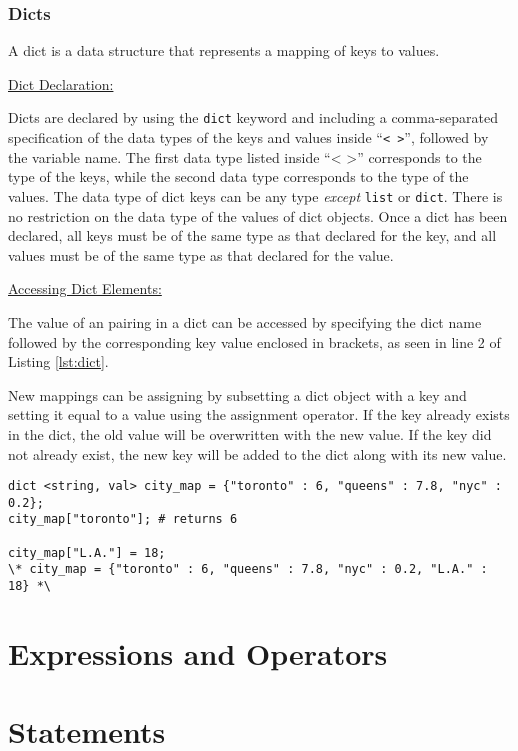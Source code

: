 \documentclass{article}
\newcommand{\code}[1]{\texttt{#1}} %
\begin{document}
\subsubsection{Dicts}

A dict is a data structure that represents a mapping of keys to values. 

\underline{Dict Declaration:}

Dicts are declared by using the \code{dict} keyword and including a comma-separated specification of the data types of the keys and values inside ``\code{< >}'', followed by the variable name. The first data type listed inside ``< >'' corresponds to the type of the keys, while the second data type corresponds to the type of the values. The data type of dict keys can be any type \emph{except} \code{list} or \code{dict}. There is no restriction on the data type of the values of dict objects. Once a dict has been declared, all keys must be of the same type as that declared for the key, and all values must be of the same type as that declared for the value. 

\underline{Accessing Dict Elements:}

The value of an pairing in a dict can be accessed by specifying the dict name followed by the corresponding key value enclosed in brackets, as seen in line 2 of Listing \ref{lst:dict}.

New mappings can be assigning by subsetting a dict object with a key and setting it equal to a value using the assignment operator. If the key already exists in the dict, the old value will be overwritten with the new value. If the key did not already exist, the new key will be added to the dict along with its new value.


\begin{lstlisting}[language=pltLang, caption=The ``dict'' type., label=lst:dict]
dict <string, val> city_map = {"toronto" : 6, "queens" : 7.8, "nyc" : 0.2};
city_map["toronto"]; # returns 6

city_map["L.A."] = 18;
\* city_map = {"toronto" : 6, "queens" : 7.8, "nyc" : 0.2, "L.A." : 18} *\

\end{lstlisting}

\section{Expressions and Operators}

\section{Statements}
\end{document}
